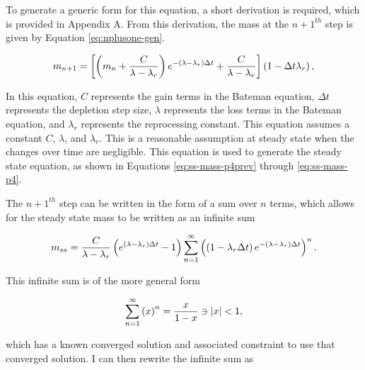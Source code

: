 To generate a generic form for this equation, a short derivation is required, which is provided in Appendix A. From this derivation, the mass at the $n+1^{th}$ step is given by Equation \eqref{eq:nplusone-gen}.

\begin{equation} \hfill 
m_{n+1} = \left[ \left(m_n + \frac{C}{\lambda - \lambda_r} \right)e^{-(\lambda - \lambda_r) \Delta t} + \frac{C}{\lambda - \lambda_r} \right] \left(1 - \Delta t \lambda_r \right),
\hfill\label{eq:nplusone-gen} \end{equation}

In this equation, $C$ represents the gain terms in the Bateman equation, $\Delta t$ represents the depletion step size, $\lambda$ represents the loss terms in the Bateman equation, and $\lambda_r$ represents the reprocessing constant. This equation assumes a constant $C$, $\lambda$, and $\lambda_r$.
This is a reasonable assumption at steady state when the changes over time are negligible. This equation is used to generate the steady state equation, as shown in Equations \eqref{eq:ss-mass-p4prev} through \eqref{eq:ss-mass-p4}.


The $n+1^{th}$ step can be written in the form of a sum over $n$ terms, which allows for the steady state mass to be written as an infinite sum

\begin{equation} \hfill 
m_{ss} =  \frac{C}{\lambda - \lambda_r} \left(e^{(\lambda - \lambda_r) \Delta t} - 1 \right) \sum_{n=1}^{\infty} \left( \left(1 - \lambda_r \Delta t \right) e^{-(\lambda - \lambda_r) \Delta t} \right)^n.
\hfill\label{eq:ss-mass-p4prev} \end{equation}

This infinite sum is of the more general form

\begin{equation} \hfill 
\sum_{n=1}^\infty \left( x \right)^n = \frac{x}{1-x} \ni |x| < 1,
\hfill\label{eq:ss-mass-p4next} \end{equation}

which has a known converged solution and associated constraint to use that converged solution. I can then rewrite the infinite sum as

